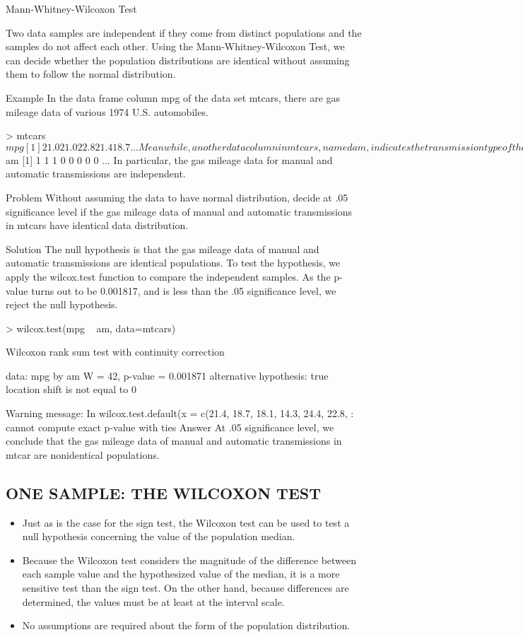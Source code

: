 Mann-Whitney-Wilcoxon Test

Two data samples are independent if they come from distinct populations and the samples do not affect each other. Using the Mann-Whitney-Wilcoxon Test, we can decide whether the population distributions are identical without assuming them to follow the normal distribution.

Example
In the data frame column mpg of the data set mtcars, there are gas mileage data of various 1974 U.S. automobiles.

> mtcars$mpg 
 [1] 21.0 21.0 22.8 21.4 18.7 ...
Meanwhile, another data column in mtcars, named am, indicates the transmission type of the automobile model (0 = automatic, 1 = manual). In other words, it is the differentiating factor of the transmission type.

> mtcars$am 
 [1] 1 1 1 0 0 0 0 0 ...
In particular, the gas mileage data for manual and automatic transmissions are independent.

Problem
Without assuming the data to have normal distribution, decide at .05 significance level if the gas mileage data of manual and automatic transmissions in mtcars have identical data distribution.

Solution
The null hypothesis is that the gas mileage data of manual and automatic transmissions are identical populations. To test the hypothesis, we apply the wilcox.test function to compare the independent samples. As the p-value turns out to be 0.001817, and is less than the .05 significance level, we reject the null hypothesis.

> wilcox.test(mpg ~ am, data=mtcars) 
 
        Wilcoxon rank sum test with continuity correction 
 
data:  mpg by am 
W = 42, p-value = 0.001871 
alternative hypothesis: true location shift is not equal to 0 
 
Warning message: 
In wilcox.test.default(x = c(21.4, 18.7, 18.1, 14.3, 24.4, 22.8,  : 
  cannot compute exact p-value with ties
Answer
At .05 significance level, we conclude that the gas mileage data of manual and automatic transmissions in mtcar are nonidentical populations.


\subsection*{ONE SAMPLE: THE WILCOXON TEST}
\begin{itemize}
\item Just as is the case for the sign test, the Wilcoxon test can be used to test a null hypothesis concerning the
value of the population median. 
\item Because the Wilcoxon test considers the magnitude of the difference between
each sample value and the hypothesized value of the median, it is a more sensitive test than the sign test. On the
other hand, because differences are determined, the values must be at least at the interval scale. 
\item No assumptions
are required about the form of the population distribution.
\end{itemize}

